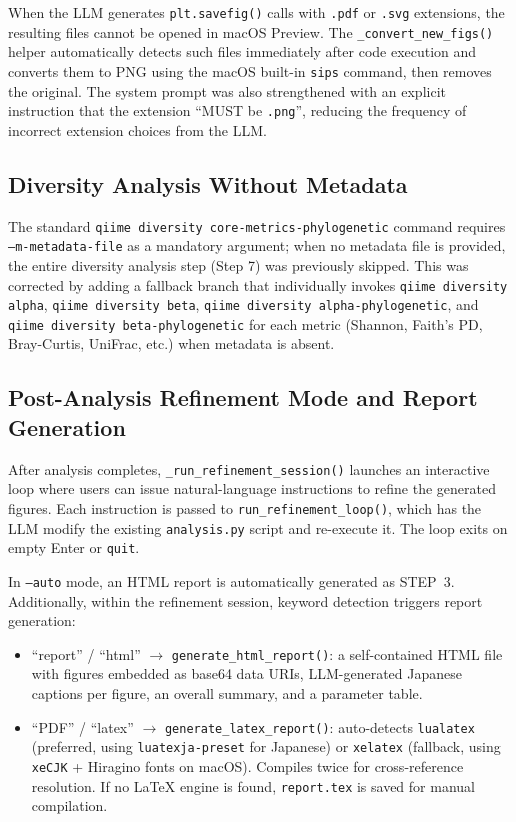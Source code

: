 \documentclass[12pt, a4paper]{article}
\begin{document}
When the LLM generates \texttt{plt.savefig()} calls with \texttt{.pdf} or
\texttt{.svg} extensions, the resulting files cannot be opened in macOS Preview.
The \texttt{\_convert\_new\_figs()} helper automatically detects such files
immediately after code execution and converts them to PNG using the macOS
built-in \texttt{sips} command, then removes the original.
The system prompt was also strengthened with an explicit instruction that
the extension ``MUST be \texttt{.png}'', reducing the frequency of incorrect
extension choices from the LLM.

\subsection{Diversity Analysis Without Metadata}

The standard \texttt{qiime diversity core-metrics-phylogenetic} command
requires \texttt{--m-metadata-file} as a mandatory argument; when no metadata
file is provided, the entire diversity analysis step (Step 7) was previously
skipped. This was corrected by adding a fallback branch that individually
invokes \texttt{qiime diversity alpha}, \texttt{qiime diversity beta},
\texttt{qiime diversity alpha-phylogenetic}, and
\texttt{qiime diversity beta-phylogenetic} for each metric
(Shannon, Faith's PD, Bray-Curtis, UniFrac, etc.) when metadata is absent.

\subsection{Post-Analysis Refinement Mode and Report Generation}

After analysis completes, \texttt{\_run\_refinement\_session()} launches
an interactive loop where users can issue natural-language instructions to
refine the generated figures. Each instruction is passed to
\texttt{run\_refinement\_loop()}, which has the LLM modify the existing
\texttt{analysis.py} script and re-execute it. The loop exits on empty
Enter or \texttt{quit}.

In \texttt{--auto} mode, an HTML report is automatically generated as STEP~3.
Additionally, within the refinement session, keyword detection triggers report generation:

\begin{itemize}
  \item ``report'' / ``html'' $\rightarrow$ \texttt{generate\_html\_report()}:
    a self-contained HTML file with figures embedded as base64 data URIs,
    LLM-generated Japanese captions per figure, an overall summary, and
    a parameter table.
  \item ``PDF'' / ``latex'' $\rightarrow$ \texttt{generate\_latex\_report()}:
    auto-detects \texttt{lualatex} (preferred, using \texttt{luatexja-preset}
    for Japanese) or \texttt{xelatex} (fallback, using \texttt{xeCJK} +
    Hiragino fonts on macOS). Compiles twice for cross-reference resolution.
    If no LaTeX engine is found, \texttt{report.tex} is saved for
    manual compilation.
\end{itemize}
\end{document}
